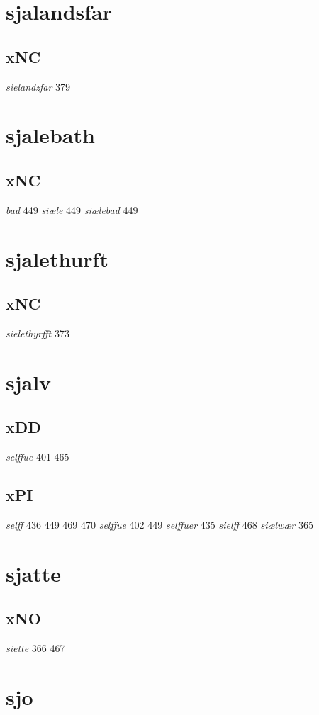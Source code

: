 \documentclass[a4paper,twocolumn]{article}
\begin{document}
\section{sjalandsfar}
\label{sec:org7dc510e}
\subsection{xNC}
\label{sec:orgfe8f063}
\emph{sielandzfar} 379 
\section{sjalebath}
\label{sec:orga81a2bc}
\subsection{xNC}
\label{sec:orgf510c3d}
\emph{bad} 449 \emph{siæle} 449 \emph{siælebad} 449 
\section{sjalethurft}
\label{sec:org2675eee}
\subsection{xNC}
\label{sec:org9f991e6}
\emph{sielethyrfft} 373 
\section{sjalv}
\label{sec:org2bb00c2}
\subsection{xDD}
\label{sec:org4ce8f77}
\emph{selffue} 401 465 
\subsection{xPI}
\label{sec:org9a43a47}
\emph{selff} 436 449 469 470 \emph{selffue} 402 449 \emph{selffuer} 435 \emph{sielff} 468 \emph{siælwær} 365 
\section{sjatte}
\label{sec:orgc437701}
\subsection{xNO}
\label{sec:org410f391}
\emph{siette} 366 467 
\section{sjo}
\label{sec:orgda2d8eb}
\end{document}
